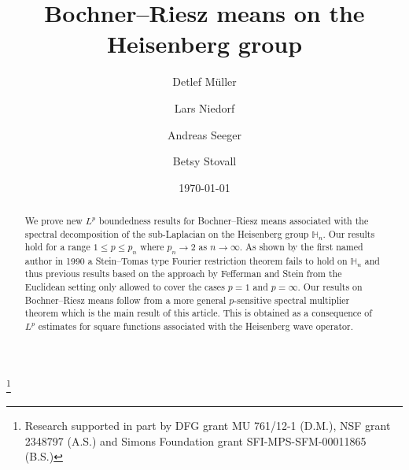 \documentclass[leqno]{amsart}
\theoremstyle{definition}
\theoremstyle{remark}
\numberwithin{equation}{section}
\begin{document}
\title{Bochner--Riesz means on the Heisenberg group}

\author[D. Müller]{Detlef Müller}
\address{D. Müller, Mathematisches Seminar, C.A.-Universität Kiel, Heinrich-Hecht-Platz 6, 24118 Kiel, Germany}

\author[L. Niedorf]{Lars Niedorf}
\address{L. Niedorf, Department of Mathematics, University of Wisconsin-Madison, 480 Lincoln Drive, Madison, WI 53706, USA}

\author[A. Seeger]{Andreas Seeger}
\address{A. Seeger, Department of Mathematics, University of Wisconsin-Madison, 480 Lincoln Drive, Madison, WI 53706, USA}

\author[B. Stovall]{Betsy Stovall}
\address{B. Stovall, Department of Mathematics, University of Wisconsin-Madison, 480 Lincoln Drive, Madison, WI 53706, USA}




\thanks{Research supported in part by  DFG grant MU 761/12-1 (D.M.), NSF grant 2348797 (A.S.) and Simons Foundation grant  SFI-MPS-SFM-00011865  (B.S.)}   

\begin{abstract} We prove new $L^p$ boundedness results for Bochner--Riesz means associated with the spectral decomposition of the sub-Laplacian on the  Heisenberg group $\mathbb H_n$. Our results hold for a range $1\le p\le p_n$ where $p_n\to 2$ as $n\to\infty$. As shown by the first named author in 1990 a Stein--Tomas type Fourier restriction theorem fails to hold on $\mathbb H_n$  and thus  previous  results  based on the approach by Fefferman and Stein from the Euclidean setting  only allowed to cover the cases $p=1$ and $p=\infty$. Our results on Bochner--Riesz means follow from a more general $p$-sensitive spectral multiplier theorem which is the main result of this article. This  is obtained as a  consequence of  $L^p$ estimates for square functions associated with the Heisenberg wave operator. 
\end{abstract}

\date{\today}
\maketitle
\end{document}
